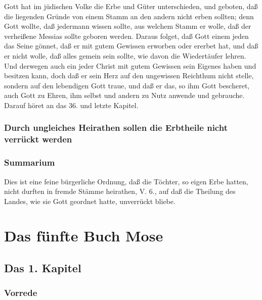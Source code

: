 Gott hat im jüdischen Volke die Erbe und Güter unterschieden, und geboten, daß die liegenden Gründe von einem Stamm an den andern
 nicht erben sollten; denn Gott wollte, daß jedermann wissen sollte, aus welchem Stamm er wolle, daß der verheißene Messias sollte geboren werden. Daraus folget, daß Gott einem jeden das Seine gönnet, daß er mit gutem Gewissen erworben oder ererbet hat, und daß er nicht wolle, daß alles gemein sein sollte, wie davon die Wiedertäufer lehren. Und derwegen auch ein jeder Christ mit gutem Gewissen sein Eigenes haben und besitzen kann, doch daß er sein Herz auf den ungewissen Reichthum nicht stelle, sondern auf den lebendigen Gott traue, und daß er das, so ihm Gott bescheret, auch Gott zu Ehren, ihm selbst und andern zu Nutz anwende und gebrauche. Darauf höret an das 36. und letzte Kapitel.

\section[Durch ungleiches Heirathen sollen die Erbtheile nicht verrückt]{Durch ungleiches Heirathen sollen die Erbtheile nicht verrückt werden}

\section{Summarium}

Dies ist eine feine bürgerliche Ordnung, daß die Töchter, so eigen Erbe hatten, nicht durften in fremde Stämme heirathen, V. 6., auf daß die Theilung des Landes, wie sie Gott geordnet hatte, unverrückt bliebe.

\part{Das fünfte Buch Mose}

\chapter{Das 1. Kapitel}

\section{Vorrede}

